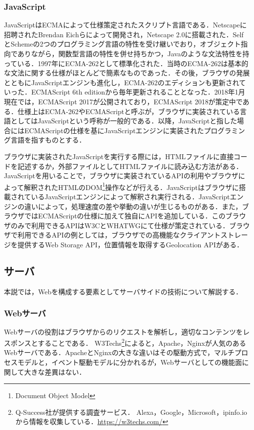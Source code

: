 \subsubsection{JavaScript}
JavaScriptはECMAによって仕様策定されたスクリプト言語である．Netscapeに招聘されたBrendan Eichらによって開発され，Netscape 2.0に搭載された．SelfとSchemeの2つのプログラミング言語の特性を受け継いでおり，オブジェクト指向でありながら，関数型言語の特性を併せ持ちかつ，Javaのような文法特性を持っている．1997年にECMA-262として標準化された．当時のECMA-262は基本的な文法に関する仕様がほとんどで簡素なものであった．その後，ブラウザの発展とともにJavaScriptエンジンも進化し，ECMA-262のエディションも更新されていった．ECMAScript 6th editionから毎年更新されることとなった．2018年1月現在では，ECMAScript 2017が公開されており，ECMAScript 2018が策定中である．仕様上はECMA-262やECMAScriptと呼ぶが，ブラウザに実装されている言語としてはJavaScriptという呼称が一般的である．以降，JavaScriptと指した場合にはECMAScriptの仕様を基にJavaScriptエンジンに実装されたプログラミング言語を指すものとする．

ブラウザに実装されたJavaScriptを実行する際には，HTMLファイルに直接コードを記述するか，外部ファイルとしてHTMLファイルに読み込む方法がある．JavaScriptを用いることで，ブラウザに実装されているAPIの利用やブラウザによって解釈されたHTMLのDOM\footnote{Document Object Model}操作などが行える．JavaScriptはブラウザに搭載されているJavaScriptエンジンによって解釈され実行される．JavaScriptエンジンの違いによって，処理速度の差や挙動の違いが生じるものがある．また，ブラウザではECMAScriptの仕様に加えて独自にAPIを追加している．このブラウザのみで利用できるAPIはW3CとWHATWGにて仕様が策定されている．ブラウザで利用できるAPIの例としては，ブラウザでの高機能なクライアントストレージを提供するWeb Storage API，位置情報を取得するGeolocation APIがある．
\subsection{サーバ}
本説では，Webを構成する要素としてサーバサイドの技術について解説する．
\subsubsection{Webサーバ}
Webサーバの役割はブラウザからのリクエストを解析し，適切なコンテンツをレスポンスとすることである．
W3Techs\footnote{Q-Success社が提供する調査サービス． Alexa，Google，Microsoft，ipinfo.ioから情報を収集している．\url{https://w3techs.com/}}によると，Apache，Nginxが人気のあるWebサーバである．ApacheとNginxの大きな違いはその駆動方式で，マルチプロセスモデルと，イベント駆動モデルに分かれるが，Webサーバとしての機能面に関して大きな差異はない．
